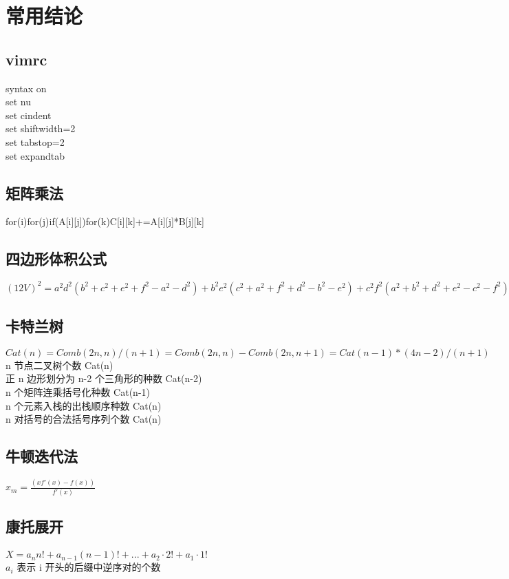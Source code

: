 \section{常用结论}
\subsection{vimrc}
syntax on \\
set nu \\
set cindent \\
set shiftwidth=2 \\
set tabstop=2 \\ 
set expandtab \\
\subsection{矩阵乘法}
for(i)for(j)if(A[i][j])for(k)C[i][k]+=A[i][j]*B[j][k]
\subsection{四边形体积公式}
$ (12V)^2 = a^2d^2(b^2 + c^2 + e^2 + f^2 − a^2 − d^2) + b^2e^2(c^2 + a^2 + f^2 + d^2 − b^2 − e^2) + c^2f^2(a^2 + b^2 + d^2 + e^2 −c^2 − f^2) − a^2b^2c^2 − a^2e^2f^2 − d^2b^2f^2 − d^2e^2c^2 $
\subsection{卡特兰树}
$ Cat(n)=Comb(2n,n)/(n+1)=Comb(2n,n)-Comb(2n,n+1)=Cat(n-1)*(4n-2)/(n+1) $ \\
n 节点二叉树个数 Cat(n) \\
正 n 边形划分为 n-2 个三角形的种数 Cat(n-2) \\
n 个矩阵连乘括号化种数 Cat(n-1) \\
n 个元素入栈的出栈顺序种数 Cat(n) \\
n 对括号的合法括号序列个数 Cat(n) \\
\subsection{牛顿迭代法}
$ x_m = \frac{(xf'(x)-f(x))}{f'(x)} $
\subsection{康托展开}
\paragraph{}
$ X = a_n  n! + a_{n-1}  (n - 1)! + ... + a_2 \cdot 2! + a_1 \cdot 1! $ \\
$ a_i $ 表示 i 开头的后缀中逆序对的个数

